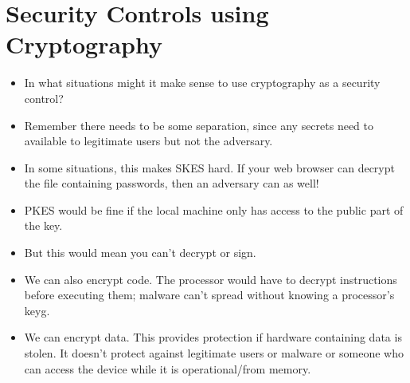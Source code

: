\documentclass{article}
\begin{document}
\section{Security Controls using Cryptography}
\begin{itemize}
    \item In what situations might it make sense to use cryptography as a security control?
    \item Remember there needs to be some separation, since any secrets need to available to legitimate users but not the adversary.
    \item In some situations, this makes SKES hard.  If your web browser can decrypt the file containing passwords, then an adversary can as well!
    \item PKES would be fine if the local machine only has access to the public part of the key.
    \item But this would mean you can't decrypt or sign.
    \item We can also encrypt code.  The processor would have to decrypt instructions before executing them; malware can't spread without knowing a processor's keyg.
    \item We can encrypt data.  This provides protection if hardware containing data is stolen.  It doesn't protect against legitimate users or malware or someone who can access the device while it is operational/from memory.
\end{itemize}
\end{document}
